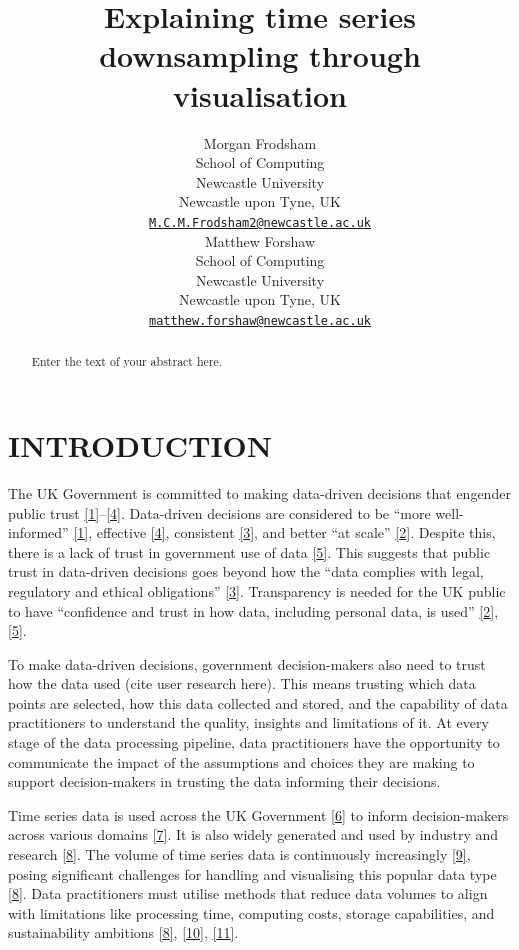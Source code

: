 \documentclass{article}
\title{Explaining time series downsampling through visualisation}
\author{
    Morgan Frodsham
   \\
    School of Computing \\
    Newcastle University \\
  Newcastle upon Tyne, UK \\
  \texttt{\href{mailto:M.C.M.Frodsham2@newcastle.ac.uk}{\nolinkurl{M.C.M.Frodsham2@newcastle.ac.uk}}} \\
   \And
    Matthew Forshaw
   \\
    School of Computing \\
    Newcastle University \\
  Newcastle upon Tyne, UK \\
  \texttt{\href{mailto:matthew.forshaw@newcastle.ac.uk}{\nolinkurl{matthew.forshaw@newcastle.ac.uk}}} \\
  }
\begin{document}
\maketitle


\begin{abstract}
Enter the text of your abstract here.
\end{abstract}


\twocolumn

\hypertarget{introduction}{%
\section{INTRODUCTION}\label{introduction}}

The UK Government is committed to making data-driven decisions that
engender public trust
\protect\hyperlink{ref-data2017}{{[}1{]}}--\protect\hyperlink{ref-data2022}{{[}4{]}}.
Data-driven decisions are considered to be ``more well-informed''
\protect\hyperlink{ref-data2017}{{[}1{]}}, effective
\protect\hyperlink{ref-data2022}{{[}4{]}}, consistent
\protect\hyperlink{ref-data2021}{{[}3{]}}, and better ``at scale''
\protect\hyperlink{ref-data2020}{{[}2{]}}. Despite this, there is a lack
of trust in government use of data
\protect\hyperlink{ref-trust}{{[}5{]}}. This suggests that public trust
in data-driven decisions goes beyond how the ``data complies with legal,
regulatory and ethical obligations''
\protect\hyperlink{ref-data2021}{{[}3{]}}. Transparency is needed for
the UK public to have ``confidence and trust in how data, including
personal data, is used'' \protect\hyperlink{ref-data2020}{{[}2{]}},
\protect\hyperlink{ref-trust}{{[}5{]}}.

To make data-driven decisions, government decision-makers also need to
trust how the data used (cite user research here). This means trusting
which data points are selected, how this data collected and stored, and
the capability of data practitioners to understand the quality, insights
and limitations of it. At every stage of the data processing pipeline,
data practitioners have the opportunity to communicate the impact of the
assumptions and choices they are making to support decision-makers in
trusting the data informing their decisions.

Time series data is used across the UK Government
\protect\hyperlink{ref-pathway}{{[}6{]}} to inform decision-makers
across various domains \protect\hyperlink{ref-onstool}{{[}7{]}}. It is
also widely generated and used by industry and research
\protect\hyperlink{ref-TVStore}{{[}8{]}}. The volume of time series data
is continuously increasingly \protect\hyperlink{ref-datapoint}{{[}9{]}},
posing significant challenges for handling and visualising this popular
data type \protect\hyperlink{ref-TVStore}{{[}8{]}}. Data practitioners
must utilise methods that reduce data volumes to align with limitations
like processing time, computing costs, storage capabilities, and
sustainability ambitions \protect\hyperlink{ref-TVStore}{{[}8{]}},
\protect\hyperlink{ref-Sveinn}{{[}10{]}},
\protect\hyperlink{ref-Shift}{{[}11{]}}.
\end{document}
